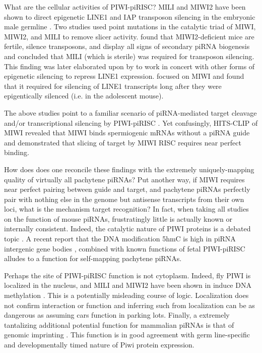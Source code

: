 {    What are the cellular activities of PIWI-piRISC? MILI and MIWI2 have been shown to direct epigenetic LINE1 and IAP transposon silencing in the embryonic male germline \citep{Aravin2007,Carmell2007,Kuramochi2008}. Two studies \citep{DeFazio2011,Reuter2011} used point mutations in the catalytic triad of MIWI, MIWI2, and MILI to remove slicer activity. \citet{DeFazio2011} found that MIWI2-deficient mice are fertile, silence transposons, and display all signs of secondary piRNA biogenesis and concluded that MILI (which is sterile) was required for transposon silencing. This finding was later elaborated upon by \citet{DiGiacomo2013} to work in concert with other forms of epigenetic silencing to repress LINE1 expression. \citet{Reuter2011} focused on MIWI and found that it required for silencing of LINE1 transcripts long after they were epigentically silenced (i.e. in the adolescent mouse).

    The above studies point to a familiar scenario of piRNA-mediated target cleavage and/or transcriptional silencing by PIWI-piRISC \citep{Meister2013}. Yet confusingly, HITS-CLIP of MIWI revealed that MIWI binds spermiogenic mRNAs without a piRNA guide \citep{Vourekas2012} and \citet{Reuter2011} demonstrated that slicing of target by MIWI RISC requires near perfect binding.
    
    How does does one reconcile these findings with the extremely uniquely-mapping quality of virtually all pachytene piRNAs? Put another way, if MIWI requires near perfect pairing between guide and target, and pachytene piRNAs perfectly pair with nothing else in the genome but antisense transcripts from their own loci, what is the mechanism target recognition? In fact, when taking all studies on the function of mouse piRNAs, frustratingly little is actually known or internally consistent. Indeed, the catalytic nature of PIWI proteins is a debated topic \citep{Luteijn2013,Meister2013}. A recent report that the DNA modification 5hmC is high in piRNA intergenic gene bodies \citep{Gan2013}, combined with known functions of fetal PIWI-piRISC alludes to a function for self-mapping pachytene piRNAs.

    Perhaps the site of PIWI-piRISC function is not cytoplasm. Indeed, fly PIWI is localized in the nucleus, and MILI and MIWI2 have been shown in induce DNA methylation \citep{Cox2000,Aravin2008}. This is a potentially misleading course of logic. Localization does not confirm interaction \citep{North2006} or function and inferring such from localization can be as dangerous as assuming cars function in parking lots. Finally, a extremely tantalizing additional potential function for mammalian piRNAs is that of genomic imprinting \citep{Watanabe2011}. This function is in good agreement with germ line-specific and developmentally timed nature of Piwi protein expression.

}
